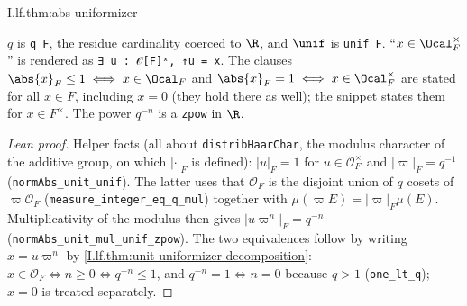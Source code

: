 \begin{theorem}
\end{theorem}
\begin{tfformal}{I.lf.thm:abs-uniformizer}
\begin{tffidelity}
$q$ is \texttt{q F}, the residue cardinality coerced to $\R$, and $\unif$ is \texttt{unif F}. ``$x\in\Ocal_F^\times$'' is rendered as \texttt{∃ u : 𝒪[F]ˣ, ↑u = x}. The clauses $\abs{x}_F\le1\iff x\in\Ocal_F$ and $\abs{x}_F=1\iff x\in\Ocal_F^\times$ are stated for all $x\in F$, including $x=0$ (they hold there as well); the snippet states them for $x\in F^\times$. The power $q^{-n}$ is a \texttt{zpow} in $\R$.
\end{tffidelity}
\end{tfformal}
\begin{proof}[Lean proof]
Helper facts (all about \texttt{distribHaarChar}, the modulus character of the additive group, on which $|\cdot|_F$ is defined): $|u|_F=1$ for $u\in\mathcal O_F^\times$ and $|\varpi|_F=q^{-1}$ (\texttt{normAbs\_unit\_unif}). The latter uses that $\mathcal O_F$ is the disjoint union of $q$ cosets of $\varpi\mathcal O_F$ (\texttt{measure\_integer\_eq\_q\_mul}) together with $\mu(\varpi E)=|\varpi|_F\mu(E)$. Multiplicativity of the modulus then gives $|u\varpi^n|_F=q^{-n}$ (\texttt{normAbs\_unit\_mul\_unif\_zpow}). The two equivalences follow by writing $x=u\varpi^n$ by \cref{I.lf.thm:unit-uniformizer-decomposition}: $x\in\mathcal O_F\iff n\ge0\iff q^{-n}\le1$, and $q^{-n}=1\iff n=0$ because $q>1$ (\texttt{one\_lt\_q}); $x=0$ is treated separately.
\end{proof}

